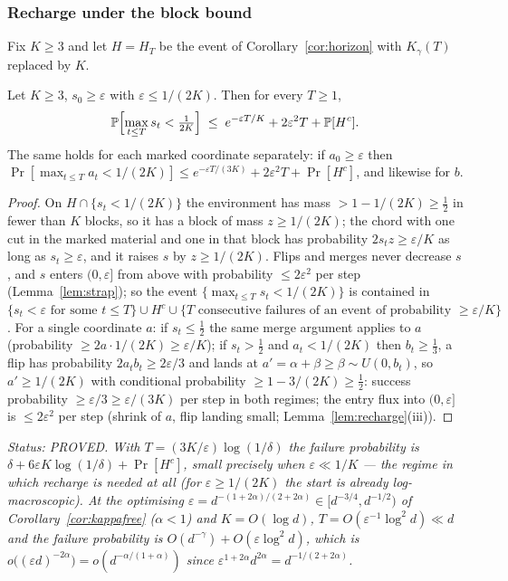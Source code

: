 \subsubsection{Recharge under the block bound}\label{sec:recharge}

Fix $K\ge3$ and let $H=H_T$ be the event of Corollary~\ref{cor:horizon}
with $K_\gamma(T)$ replaced by $K$.

\begin{lemma}\label{lem:srecharge}
Let $K\ge3$, $s_0\ge\varepsilon$ with $\varepsilon\le1/(2K)$.  Then for every
$T\ge1$,
\[
\Pr\Bigl[\max_{t\le T}s_t<\tfrac1{2K}\Bigr]
\;\le\;e^{-\varepsilon T/K}+2\varepsilon^2T+\Pr[H^c].
\]
The same holds for each marked coordinate separately: if
$a_0\ge\varepsilon$ then
$\Pr[\max_{t\le T}a_t<1/(2K)]\le e^{-\varepsilon T/(3K)}+2\varepsilon^2T+\Pr[H^c]$,
and likewise for $b$.
\end{lemma}

\begin{proof}
On $H\cap\{s_t<1/(2K)\}$ the environment has mass $>1-1/(2K)\ge\tfrac12$
in fewer than $K$ blocks, so it has a block of mass $z\ge1/(2K)$; the
chord with one cut in the marked material and one in that block has
probability $2s_tz\ge\varepsilon/K$ as long as $s_t\ge\varepsilon$, and
it raises $s$ by $z\ge1/(2K)$.  Flips and merges never decrease $s$, and
$s$ enters $(0,\varepsilon]$ from above with probability $\le2\varepsilon^2$
per step (Lemma~\ref{lem:strap}); so the event $\{\max_{t\le T}s_t<1/(2K)\}$
is contained in $\{s_t<\varepsilon\text{ for some }t\le T\}\cup H^c\cup
\{T\text{ consecutive failures of an event of probability }\ge\varepsilon/K\}$.
For a single coordinate $a$: if $s_t\le\tfrac12$ the same merge
argument applies to $a$ (probability $\ge2a\cdot1/(2K)\ge\varepsilon/K$);
if $s_t>\tfrac12$ and $a_t<1/(2K)$ then $b_t\ge\tfrac13$, a flip has
probability $2a_tb_t\ge2\varepsilon/3$ and lands at
$a'=\alpha+\beta\ge\beta\sim U(0,b_t)$, so $a'\ge1/(2K)$ with conditional
probability $\ge1-3/(2K)\ge\tfrac12$: success probability
$\ge\varepsilon/3\ge\varepsilon/(3K)$ per step in both regimes; the
entry flux into $(0,\varepsilon]$ is $\le2\varepsilon^2$ per step
(shrink of $a$, flip landing small; Lemma~\ref{lem:recharge}(iii)).
\end{proof}

\emph{Status: PROVED.  With $T=(3K/\varepsilon)\log(1/\delta)$ the
failure probability is $\delta+6\varepsilon K\log(1/\delta)+\Pr[H^c]$,
small precisely when $\varepsilon\ll1/K$ --- the regime in which
recharge is needed at all (for $\varepsilon\ge1/(2K)$ the start is
already log-macroscopic).  At the optimising
$\varepsilon=d^{-(1+2\alpha)/(2+2\alpha)}\in[d^{-3/4},d^{-1/2})$ of
Corollary~\ref{cor:kappafree} ($\alpha<1$) and $K=O(\log d)$,
$T=O(\varepsilon^{-1}\log^2d)\ll d$ and the failure probability is
$O(d^{-\gamma})+O(\varepsilon\log^2d)$, which is
$o\bigl((\varepsilon d)^{-2\alpha}\bigr)=o(d^{-\alpha/(1+\alpha)})$ since
$\varepsilon^{1+2\alpha}d^{2\alpha}=d^{-1/(2+2\alpha)}$.}

